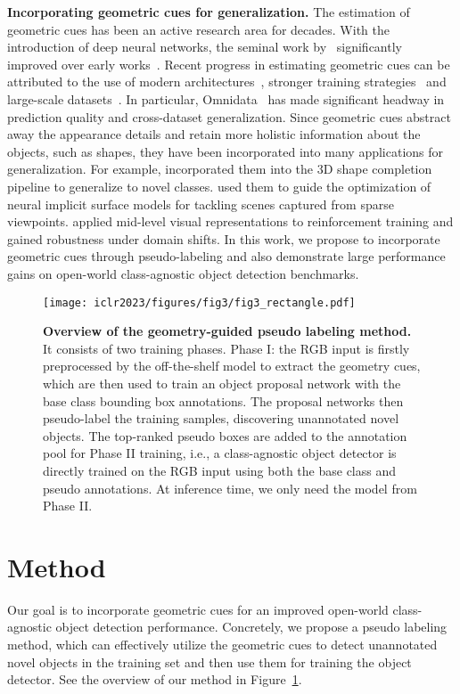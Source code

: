 \documentclass{article} \usepackage{iclr2023_conference,times}
\begin{document}
\textbf{Incorporating geometric cues for generalization.} 
The estimation of geometric cues has been an active research area for decades.
With the introduction of deep neural networks, the seminal work by~\citet{eigen2014depth, eigen2015predicting} significantly improved over early works~\citep{hoiem2005automatic, hoiem2005geometric, hoiem2007recovering, hoiem2008putting, saxena2005learning, saxena20083, saxena2008make3d}. Recent progress in estimating geometric cues can be attributed to the use of modern architectures~\citep{midas}, stronger training strategies~\citep{zamir2020robust} and large-scale datasets~\citep{eftekhar2021omnidata}. 
In particular, Omnidata~\citep{eftekhar2021omnidata} has made significant headway in prediction quality and cross-dataset generalization. 
Since geometric cues abstract away the appearance details and retain more holistic information about the objects, such as shapes, they have been incorporated into many applications for generalization.
For example, \citet{Xian2022gin} incorporated them into the 3D shape completion pipeline to generalize to novel classes. \citet{Yu2022MonoSDF} used them to guide the optimization of neural implicit surface models for tackling scenes captured from sparse viewpoints. \citet{pmlr-v155-chen21f} applied mid-level visual representations to reinforcement training and gained robustness under domain shifts. 
In this work, we propose to incorporate geometric cues through pseudo-labeling and also demonstrate large performance gains on open-world class-agnostic object detection benchmarks.

 \begin{figure}[t]
    \centering
    \texttt{[image: iclr2023/figures/fig3/fig3\_rectangle.pdf]}
    \caption{\textbf{Overview of the geometry-guided pseudo labeling method.} It consists of two training phases. Phase I: the RGB input is firstly preprocessed by the off-the-shelf model to extract the geometry cues, which are then used to train an object proposal network with the base class bounding box annotations. The proposal networks then pseudo-label the training samples, discovering unannotated novel objects. The top-ranked pseudo boxes are added to the annotation pool for  Phase II training, i.e., a class-agnostic object detector is directly trained on the RGB input using both the base class and pseudo annotations. At inference time, we only need the model from Phase II.
    }
    \label{fig:pipeline}
\end{figure}

\section{Method}
Our goal is to incorporate geometric cues for an improved open-world class-agnostic object detection performance. Concretely, we propose a pseudo labeling method, which can effectively utilize the geometric cues to detect unannotated novel objects in the training set and then use them for training the object detector. See the overview of our method in Figure~\ref{fig:pipeline}.
\end{document}

